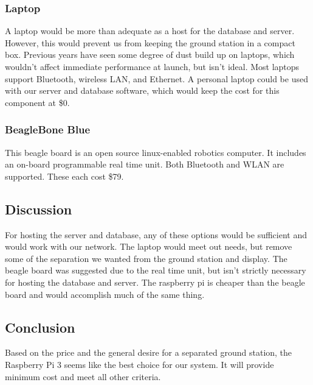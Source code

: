 \documentclass[onecolumn, draftclsnofoot,10pt, compsoc]{IEEEtran}
\begin{document}
\subsubsection{Laptop}
A laptop would be more than adequate as a host for the database and server.
However, this would prevent us from keeping the ground station in a compact box. 
Previous years have seen some degree of dust build up on laptops, which wouldn't affect immediate performance at launch, but isn't ideal.
Most laptops support Bluetooth, wireless LAN, and Ethernet.
A personal laptop could be used with our server and database software, which would keep the cost for this component at \$0. 

\subsubsection{BeagleBone Blue}
This beagle board is an open source linux-enabled robotics computer.
It includes an on-board programmable real time unit.
Both Bluetooth and WLAN are supported.
These each cost \$79.\cite{7}

\subsection{Discussion}
For hosting the server and database, any of these options would be sufficient and would work with our network.
The laptop would meet out needs, but remove some of the separation we wanted from the ground station and display.
The beagle board was suggested due to the real time unit, but isn't strictly necessary for hosting the database and server.
The raspberry pi is cheaper than the beagle board and would accomplish much of the same thing.

\subsection{Conclusion}
Based on the price and the general desire for a separated ground station, the Raspberry Pi 3 seems like the best choice for our system.
It will provide minimum cost and meet all other criteria.
 
\newpage



\end{document}
